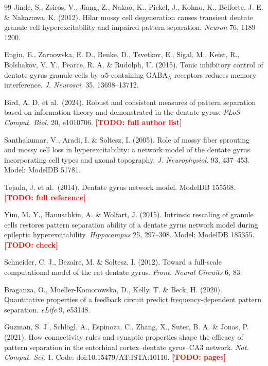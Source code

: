 \documentclass[11pt,a4paper]{article}
\newcommand{\todo}[1]{\textcolor{red}{\textbf{[TODO: #1]}}}
\begin{document}
\begin{thebibliography}{99}
 Jinde, S., Zsiros, V., Jiang, Z., Nakao, K., Pickel, J.,
Kohno, K., Belforte, J. E. \& Nakazawa, K. (2012). Hilar mossy cell degeneration
causes transient dentate granule cell hyperexcitability and impaired pattern
separation. \emph{Neuron} 76, 1189--1200.

 Engin, E., Zarnowska, E. D., Benke, D., Tsvetkov, E., Sigal,
M., Keist, R., Bolshakov, V. Y., Pearce, R. A. \& Rudolph, U. (2015). Tonic
inhibitory control of dentate gyrus granule cells by $\alpha5$-containing
GABA$_\mathrm{A}$ receptors reduces memory interference. \emph{J. Neurosci.} 35,
13698--13712.

 Bird, A. D. et al.\ (2024). Robust and consistent measures of
pattern separation based on information theory and demonstrated in the dentate
gyrus. \emph{PLoS Comput. Biol.} 20, e1010706. \todo{full author list}

 Santhakumar, V., Aradi, I. \& Soltesz, I. (2005). Role
of mossy fiber sprouting and mossy cell loss in hyperexcitability: a network
model of the dentate gyrus incorporating cell types and axonal topography.
\emph{J. Neurophysiol.} 93, 437--453. Model: ModelDB 51781.

 Tejada, J. et al.\ (2014). Dentate gyrus network model.
ModelDB 155568. \todo{full reference}

 Yim, M. Y., Hanuschkin, A. \& Wolfart, J. (2015). Intrinsic
rescaling of granule cells restores pattern separation ability of a dentate gyrus
network model during epileptic hyperexcitability. \emph{Hippocampus} 25, 297--308.
Model: ModelDB 185355. \todo{check}

 Schneider, C. J., Bezaire, M. \& Soltesz, I. (2012).
Toward a full-scale computational model of the rat dentate gyrus. \emph{Front.
Neural Circuits} 6, 83.

 Braganza, O., Mueller-Komorowska, D., Kelly, T. \& Beck,
H. (2020). Quantitative properties of a feedback circuit predict
frequency-dependent pattern separation. \emph{eLife} 9, e53148.

 Guzman, S. J., Schl\"ogl, A., Espinoza, C., Zhang, X.,
Suter, B. A. \& Jonas, P. (2021). How connectivity rules and synaptic properties
shape the efficacy of pattern separation in the entorhinal cortex--dentate
gyrus--CA3 network. \emph{Nat. Comput. Sci.} 1. Code: doi:10.15479/AT:ISTA:10110.
\todo{pages}


\end{thebibliography}
\end{document}
